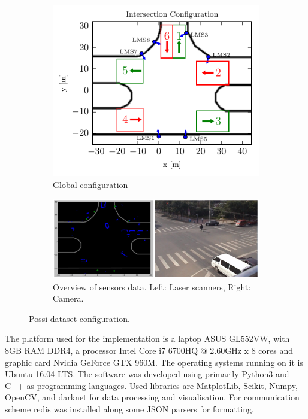 \begin{figure}[ht!]
\begin{subfigure}{\textwidth}
\centering
\includegraphics[scale=0.8]{fig/4/intersection-config2.pdf}
\caption{Global configuration}
\label{possi_img}
\end{subfigure}

\begin{subfigure}{\textwidth}
\centering
\includegraphics[scale=0.2]{fig/4/sensors_overview.jpeg}
\caption{Overview of sensors data. Left: Laser scanners, Right: Camera.}
\end{subfigure}
\caption{Possi dataset configuration.}
\label{possi_sensors:a}
\end{figure}
 

The platform used for the implementation is a laptop ASUS GL552VW, with 8GB RAM DDR4, a processor Intel Core i7 6700HQ @ 2.60GHz x 8 cores and graphic card Nvidia GeForce GTX 960M. The operating systems running on it is Ubuntu 16.04 LTS. The software was developed using primarily Python3 and C++ as programming languages. Used libraries are MatplotLib, Scikit, Numpy, OpenCV, and darknet for data processing and visualisation. For communication scheme redis was installed along some JSON parsers for formatting.

